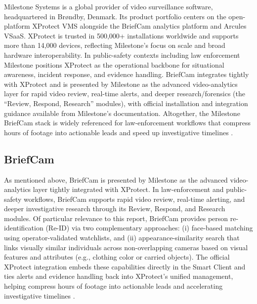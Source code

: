 Milestone Systems is a global provider of video surveillance software, headquartered in Brøndby, Denmark. Its product portfolio centers on the open-platform XProtect VMS alongside the BriefCam analytics platform and Arcules VSaaS. XProtect is trusted in 500,000+ installations worldwide and supports more than 14,000 devices, reflecting Milestone’s focus on scale and broad hardware interoperability. In public-safety contexts including law enforcement Milestone positions XProtect as the operational backbone for situational awareness, incident response, and evidence handling. BriefCam integrates tightly with XProtect and is presented by Milestone as the advanced video-analytics layer for rapid video review, real-time alerts, and deeper research/forensics (the “Review, Respond, Research” modules), with official installation and integration guidance available from Milestone’s documentation. Altogether, the Milestone BriefCam stack is widely referenced for law-enforcement workflows that compress hours of footage into actionable leads and speed up investigative timelines \cite{MilestoneSystems2025}.

\subsection{BriefCam}
As mentioned above, BriefCam is presented by Milestone as the advanced video-analytics layer tightly integrated with XProtect. In law-enforcement and public-safety workflows, BriefCam supports rapid video review, real-time alerting, and deeper investigative research through its Review, Respond, and Research modules. Of particular relevance to this report, BriefCam provides person re-identification (Re-ID) via two complementary approaches: (i) face-based matching using operator-validated watchlists, and (ii) appearance-similarity search that links visually similar individuals across non-overlapping cameras based on visual features and attributes (e.g., clothing color or carried objects). The official XProtect integration embeds these capabilities directly in the Smart Client and ties alerts and evidence handling back into XProtect’s unified management, helping compress hours of footage into actionable leads and accelerating investigative timelines \cite{MilestoneSystems2025}.

